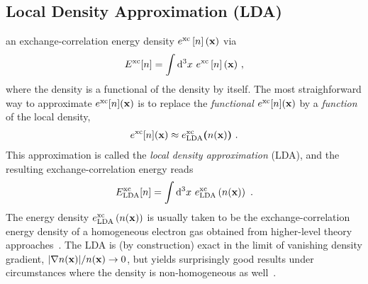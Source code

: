 \subsection{Local Density Approximation (LDA)}
 an exchange-correlation energy density $e^{\rm xc} \left[ n \right] ({\bf x})$ via
\begin{align}
	E^{\rm xc}[n] 
		= \int \d^3 x ~ e^{\rm xc} \left[ n \right] ({\bf x})~,
\label{eq:dft.xc.1}
\end{align}
where the density is a functional of the density by itself. 
The most straighforward way to approximate $e^{\rm xc}[n] ({\bf x})$ is to replace the \emph{functional} $e^{\rm xc} [n] ({\bf x})$ by a \emph{function} of the local density,
\begin{align}
	e^{\rm xc} [n] ({\bf x})
		\approx e^{\rm xc}_{\rm LDA} \bm ( n({\bf x}) \bm )~.
	\label{eq:dft.exc.lda.1}
\end{align}
This approximation is called the \emph{local density approximation} (LDA), and the resulting exchange-correlation energy reads
\begin{align}
	E^{\rm xc}_{\rm LDA}[n] 
		= \int \d^3 x ~ e^{\rm xc}_{\rm LDA} \left(n ({\bf x}) \right)~.
	\label{eq:dft.LDA.1}
\end{align}
The energy density $e^{\rm xc}_{\rm LDA} \left(n ({\bf x}) \right)$ is usually taken to be the exchange-correlation energy density of a homogeneous electron gas obtained from higher-level theory approaches~. The LDA is (by construction) exact in the limit of vanishing density gradient, $\lvert \nabla n ({\bf x}) \rvert / n({\bf x}) \rightarrow 0$, but yields surprisingly good results under circumstances where the density is non-homogeneous as well~\cite[p.\,183]{Dreizler2012}.


